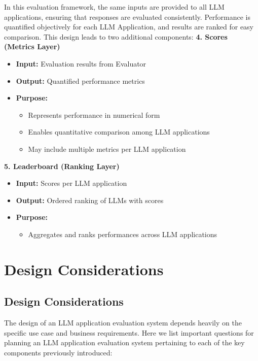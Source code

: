 In this evaluation framework, the same inputs are provided to all LLM applications, ensuring that responses are evaluated consistently. Performance is quantified objectively for each LLM Application, and results are ranked for easy comparison. This design leads to two additional components:
\textbf{4. Scores (Metrics Layer)}
\begin{itemize}
    \item \textbf{Input:} Evaluation results from Evaluator
    \item \textbf{Output:} Quantified performance metrics
    \item \textbf{Purpose:}
    \begin{itemize}
        \item Represents performance in numerical form
        \item Enables quantitative comparison among LLM applications
        \item May include multiple metrics per LLM application
    \end{itemize}
\end{itemize}

\textbf{5. Leaderboard (Ranking Layer)}
\begin{itemize}
    \item \textbf{Input:} Scores per LLM application
    \item \textbf{Output:} Ordered ranking of LLMs with scores
    \item \textbf{Purpose:}
    \begin{itemize}
        \item Aggregates and ranks performances across LLM applications
    \end{itemize}
\end{itemize}

\section{Design Considerations}
\subsection{Design Considerations}

The design of an LLM application evaluation system depends heavily on the specific use case and business requirements. Here we list important questions for planning an LLM application evaluation system pertaining to each of the key components previously introduced:

